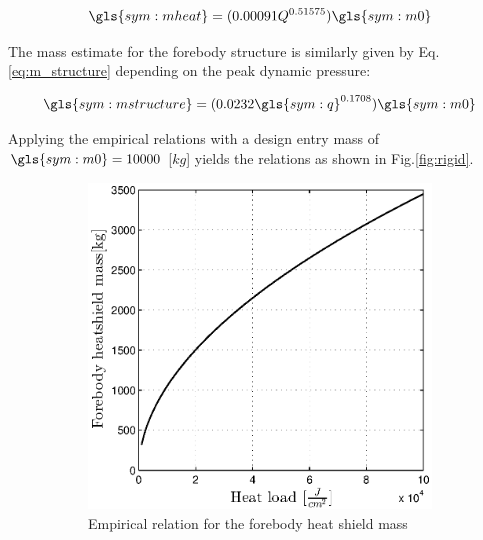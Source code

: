 \begin{equation}
\gls{sym:mheat} = (0.00091Q^{0.51575})\gls{sym:m0}
\label{eq:tps_heat}
\end{equation}

The mass estimate for the forebody structure is similarly given by Eq.\ref{eq:m_structure}\cite[p.7]{Steinfeldt2009} depending on the peak dynamic pressure:

\begin{equation}
\gls{sym:mstructure} = (0.0232 \gls{sym:q} ^{0.1708} ) \gls{sym:m0}
\label{eq:m_structure}
\end{equation}

Applying the empirical relations with a design entry mass of $\gls{sym:m0} = 10000$ [$kg$] yields the relations as shown in Fig.\ref{fig:rigid}.

\begin{figure}[h]
	\centering
	\begin{subfigure}[b]{0.49\textwidth}
	\centering
	\includegraphics[width=1.0\textwidth]{Figure/rigidheat.eps}
	\caption{Empirical relation for the forebody heat shield mass} 
	\label{rigidheat}
	\end{subfigure}
	\begin{subfigure}[b]{0.49\textwidth}
	\centering

\end{subfigure}
\end{figure}
